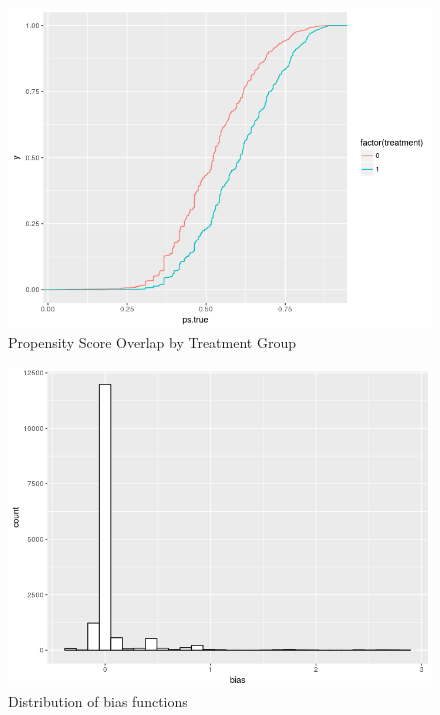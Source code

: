 \documentclass{article}
\begin{document}
\begin{figure}
\center
\caption{Propensity Score Overlap by Treatment Group}
\label{ol}
\includegraphics[scale=1]{overlap.png}
\end{figure}

\begin{figure}
\center
\caption{Distribution of bias functions}
\label{bias}
\includegraphics[scale=1]{bias.png}
\end{figure}
\end{document}
